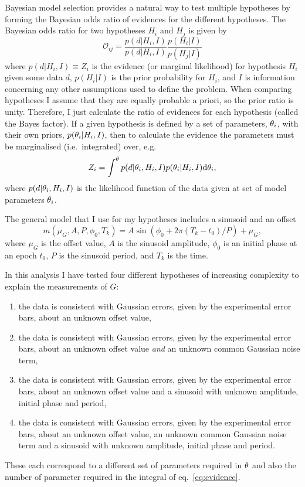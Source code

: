 \documentclass[comment]{epl2}
\begin{document}
Bayesian model selection provides a natural way to test multiple hypotheses by forming the Bayesian odds ratio of
evidences for the different hypotheses. The Bayesian odds ratio for two hypotheses $H_i$ and $H_j$ is given by
\begin{equation}
 \mathcal{O}_{ij} = \frac{p(d|H_i,I)}{p(d|H_i,I)}\frac{p(H_i|I)}{p(H_j|I)}
\end{equation}
where $p(d|H_i,I) \equiv Z_i$ is the evidence (or marginal likelihood) for hypothesis $H_i$ given some data $d$,
$p(H_i|I)$ is the prior probability for $H_i$, and $I$ is information concerning any other assumptions used to
define the problem. When comparing hypotheses I assume that they are equally
probable a priori, so the prior ratio is unity. Therefore, I just calculate
the ratio of evidences for each hypothesis (called the Bayes factor). If a given hypothesis is defined
by a set of parameters, $\mathbf{\theta}_i$, with their own priors,
$p(\mathbf{\theta}_i|H_i,I)$, then to calculate the evidence the parameters must be marginalised (i.e.\ integrated)
over, e.g.\
\begin{equation}\label{eq:evidence}
 Z_i = \int^{\mathbf{\theta}} p(d|\mathbf{\theta}_i,H_i,I) p(\mathbf{\theta}_i|H_i,I) {\rm d}\mathbf{\theta}_i,
\end{equation}
where $p(d|\mathbf{\theta}_i,H_i,I)$ is the likelihood function of the data given at set of model parameters $\mathbf{\theta}_i$.

The general model that I use for my hypotheses includes a sinusoid and an offset
\begin{equation}\label{eq:model}
 m(\mu_G, A, P, \phi_0, T_k) = A\sin{(\phi_0 + 2\pi (T_k-t_0)/P)} + \mu_G,
\end{equation}
where $\mu_G$ is the offset value, $A$ is the sinusoid amplitude, $\phi_0$ is an initial phase at an epoch $t_0$,
$P$ is the sinusoid period, and $T_k$ is the time.

In this analysis I have tested four different hypotheses of increasing complexity to explain the measurements of $G$:
\begin{enumerate}
 \item the data is consistent with Gaussian errors, given by the experimental error bars, about an unknown
 offset value,
 \item the data is consistent with Gaussian errors, given by the experimental error bars, about an unknown
 offset value {\it and} an unknown common Gaussian noise term,
 \item the data is consistent with Gaussian errors, given by the experimental error bars, about an unknown
 offset value and a sinusoid with unknown amplitude, initial phase and period,
 \item the data is consistent with Gaussian errors, given by the experimental error bars, about an unknown
 offset value, an unknown common Gaussian noise term and a sinusoid with unknown amplitude, initial phase and period.
\end{enumerate}
These each correspond to a different set of parameters required in $\mathbf{\theta}$ and also the number of
parameter required in the integral of eq.~\ref{eq:evidence}.
\end{document}
